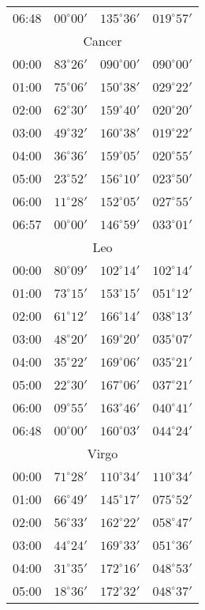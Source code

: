 \begin{table}
\begin{Parallel}{}{}
{{\begin{tabular}{l|lll}
06:48 & $00^\circ 00'$ & $135^\circ 36'$& $019^\circ 57'$ \\
\multicolumn{4}{c}{Cancer}\\
00:00 & $83^\circ 26'$ & $090^\circ 00'$& $090^\circ 00'$ \\
01:00 & $75^\circ 06'$ & $150^\circ 38'$& $029^\circ 22'$ \\
02:00 & $62^\circ 30'$ & $159^\circ 40'$& $020^\circ 20'$ \\
03:00 & $49^\circ 32'$ & $160^\circ 38'$& $019^\circ 22'$ \\
04:00 & $36^\circ 36'$ & $159^\circ 05'$& $020^\circ 55'$ \\
05:00 & $23^\circ 52'$ & $156^\circ 10'$& $023^\circ 50'$ \\
06:00 & $11^\circ 28'$ & $152^\circ 05'$& $027^\circ 55'$ \\
06:57 & $00^\circ 00'$ & $146^\circ 59'$& $033^\circ 01'$ \\
\multicolumn{4}{c}{Leo}\\
00:00 & $80^\circ 09'$ & $102^\circ 14'$& $102^\circ 14'$ \\
01:00 & $73^\circ 15'$ & $153^\circ 15'$& $051^\circ 12'$ \\
02:00 & $61^\circ 12'$ & $166^\circ 14'$& $038^\circ 13'$ \\
03:00 & $48^\circ 20'$ & $169^\circ 20'$& $035^\circ 07'$ \\
04:00 & $35^\circ 22'$ & $169^\circ 06'$& $035^\circ 21'$ \\
05:00 & $22^\circ 30'$ & $167^\circ 06'$& $037^\circ 21'$ \\
06:00 & $09^\circ 55'$ & $163^\circ 46'$& $040^\circ 41'$ \\
06:48 & $00^\circ 00'$ & $160^\circ 03'$& $044^\circ 24'$ \\
\multicolumn{4}{c}{Virgo}\\
00:00 & $71^\circ 28'$ & $110^\circ 34'$& $110^\circ 34'$ \\
01:00 & $66^\circ 49'$ & $145^\circ 17'$& $075^\circ 52'$ \\
02:00 & $56^\circ 33'$ & $162^\circ 22'$& $058^\circ 47'$ \\
03:00 & $44^\circ 24'$ & $169^\circ 33'$& $051^\circ 36'$ \\
04:00 & $31^\circ 35'$ & $172^\circ 16'$& $048^\circ 53'$ \\
05:00 & $18^\circ 36'$ & $172^\circ 32'$& $048^\circ 37'$ \\
\end{tabular}
}}
\ParallelRText{{\small
}}
\end{Parallel}
\end{table}
